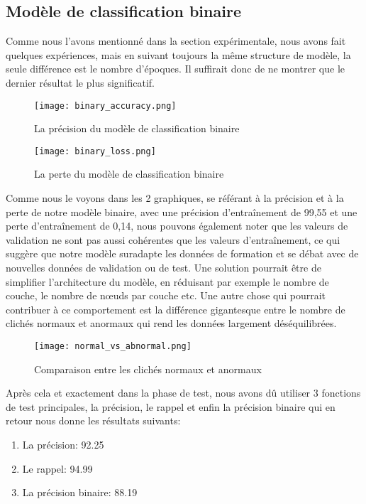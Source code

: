     \subsection{Modèle de classification binaire}
        Comme nous l'avons mentionné dans la section expérimentale, nous avons fait quelques expériences, mais en suivant toujours la même structure de modèle, la seule différence est le nombre d'époques. Il suffirait donc de ne montrer que le dernier résultat le plus significatif.
        \begin{figure}[H]
            \centering
            \texttt{[image: binary\_accuracy.png]}
            \caption{La précision du modèle de classification binaire}\label{fig:binary_accuracy}
        \end{figure}
        \begin{figure}[H]
            \centering
            \texttt{[image: binary\_loss.png]}
            \caption{La perte du modèle de classification binaire}\label{fig:binary_loss}
        \end{figure}
        Comme nous le voyons dans les 2 graphiques, se référant à la précision et à la perte de notre modèle binaire, avec une précision d'entraînement de 99,55 et une perte d'entraînement de 0,14, nous pouvons également noter que les valeurs de validation ne sont pas aussi cohérentes que les valeurs d'entraînement, ce qui suggère que notre modèle suradapte les données de formation et se débat avec de nouvelles données de validation ou de test. Une solution pourrait être de simplifier l'architecture du modèle, en réduisant par exemple le nombre de couche, le nombre de nœuds par couche etc.
        Une autre chose qui pourrait contribuer à ce comportement est la différence gigantesque entre le nombre de clichés normaux et anormaux qui rend les données largement déséquilibrées.
        \begin{figure}[H]
            \centering
            \texttt{[image: normal\_vs\_abnormal.png]}
            \caption{Comparaison entre les clichés normaux et anormaux}\label{fig:normal_vs_abnormal}
        \end{figure}
        Après cela et exactement dans la phase de test, nous avons dû utiliser 3 fonctions de test principales, la précision, le rappel et enfin la précision binaire qui en retour nous donne les résultats suivants:
        \begin{enumerate}
            \item La précision: 92.25
            \item Le rappel: 94.99
            \item La précision binaire: 88.19
        \end{enumerate}
